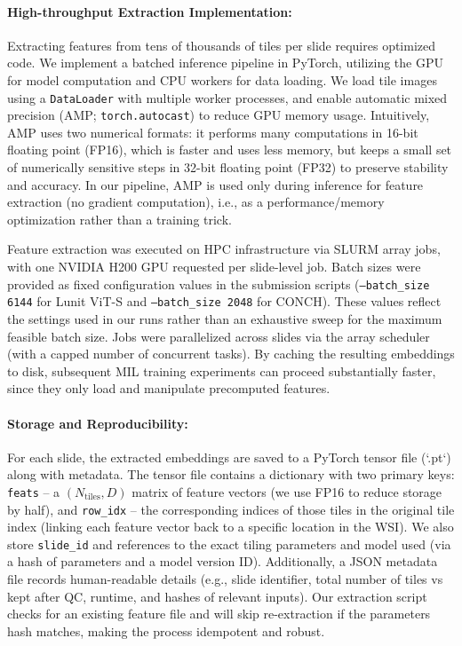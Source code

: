 \paragraph{High-throughput Extraction Implementation:} Extracting features from tens of thousands of tiles per slide requires optimized code. We implement a batched inference pipeline in PyTorch, utilizing the GPU for model computation and CPU workers for data loading. We load tile images using a \texttt{DataLoader} with multiple worker processes, and enable automatic mixed precision (AMP; \texttt{torch.autocast}) to reduce GPU memory usage. Intuitively, AMP uses two numerical formats: it performs many computations in 16-bit floating point (FP16), which is faster and uses less memory, but keeps a small set of numerically sensitive steps in 32-bit floating point (FP32) to preserve stability and accuracy. In our pipeline, AMP is used only during inference for feature extraction (no gradient computation), i.e., as a performance/memory optimization rather than a training trick.

Feature extraction was executed on HPC infrastructure via SLURM array jobs, with one NVIDIA H200 GPU requested per slide-level job. Batch sizes were provided as fixed configuration values in the submission scripts (\texttt{--batch\_size 6144} for Lunit ViT-S and \texttt{--batch\_size 2048} for CONCH). These values reflect the settings used in our runs rather than an exhaustive sweep for the maximum feasible batch size. Jobs were parallelized across slides via the array scheduler (with a capped number of concurrent tasks). By caching the resulting embeddings to disk, subsequent MIL training experiments can proceed substantially faster, since they only load and manipulate precomputed features.

\paragraph{Storage and Reproducibility:} For each slide, the extracted embeddings are saved to a PyTorch tensor file (`.pt`) along with metadata. The tensor file contains a dictionary with two primary keys: \texttt{feats} – a $(N_{\text{tiles}}, D)$ matrix of feature vectors (we use FP16 to reduce storage by half), and \texttt{row\_idx} – the corresponding indices of those tiles in the original tile index (linking each feature vector back to a specific location in the WSI). We also store \texttt{slide\_id} and references to the exact tiling parameters and model used (via a hash of parameters and a model version ID). Additionally, a JSON metadata file records human-readable details (e.g., slide identifier, total number of tiles vs kept after QC, runtime, and hashes of relevant inputs). Our extraction script checks for an existing feature file and will skip re-extraction if the parameters hash matches, making the process idempotent and robust.

